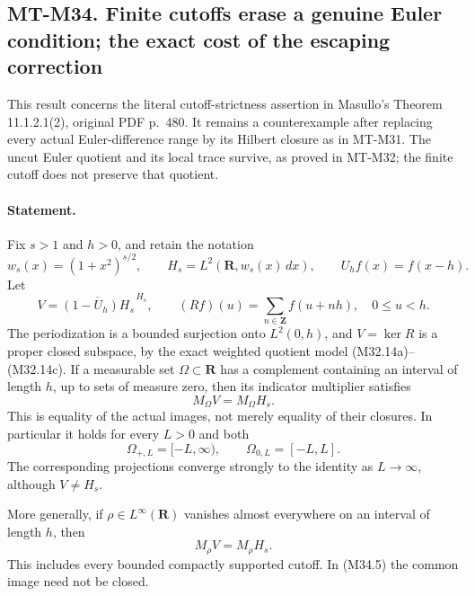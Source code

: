 \subsection*{MT-M34. Finite cutoffs erase a genuine Euler condition;
the exact cost of the escaping correction}

This result concerns the literal cutoff-strictness assertion in
Masullo's Theorem 11.1.2.1(2), original PDF p.~480.
It remains a counterexample after replacing every actual
Euler-difference range by its Hilbert closure as in MT-M31.
The uncut Euler quotient and its local trace survive, as
proved in MT-M32; the finite cutoff does not preserve that
quotient.

\paragraph{Statement.}
Fix $s>1$ and $h>0$, and retain the notation
\[
 w_s(x)=(1+x^2)^{s/2},\qquad
 H_s=L^2(\mathbf R,w_s(x)\,dx),\qquad
 U_hf(x)=f(x-h).
 \tag{M34.1}
\]
Let
\[
 V=\overline{(1-U_h)H_s}^{\,H_s},\qquad
 (Rf)(u)=\sum_{n\in\mathbf Z}f(u+nh),\quad0\le u<h.
 \tag{M34.2}
\]
The periodization is a bounded surjection onto $L^2(0,h)$,
and $V=\ker R$ is a proper closed subspace, by the exact
weighted quotient model (M32.14a)--(M32.14c).
If a measurable set $\Omega\subset\mathbf R$ has a
complement containing an interval of length $h$, up to
sets of measure zero, then its indicator multiplier satisfies
\[
               M_\Omega V=M_\Omega H_s.
 \tag{M34.3}
\]
This is equality of the actual images, not merely equality
of their closures.  In particular it holds for every $L>0$
and both
\[
 \Omega_{+,L}=[-L,\infty),\qquad
 \Omega_{0,L}=[-L,L].
 \tag{M34.4}
\]
The corresponding projections converge strongly to the
identity as $L\to\infty$, although $V\ne H_s$.

More generally, if $\rho\in L^\infty(\mathbf R)$ vanishes
almost everywhere on an interval of length $h$, then
\[
                   M_\rho V=M_\rho H_s.
 \tag{M34.5}
\]
This includes every bounded compactly supported cutoff.
In (M34.5) the common image need not be closed.

